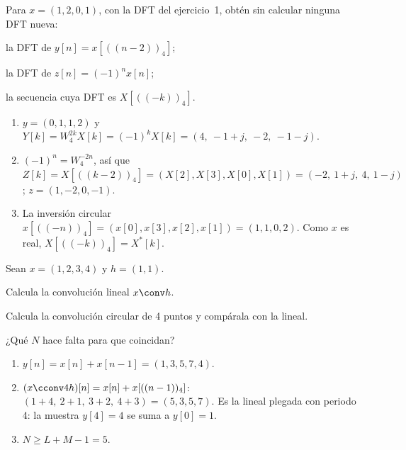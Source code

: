 \documentclass[11pt,a4paper]{scrartcl}
\begin{document}
\begin{ejercicio}
  Para $x=(1,2,0,1)$, con la DFT del ejercicio~1, obtén sin calcular ninguna DFT nueva:
  \begin{incisos}[1]
    \item la DFT de $y[n]=x[((n-2))_4]$;
    \item la DFT de $z[n]=(-1)^nx[n]$;
    \item la secuencia cuya DFT es $X[((-k))_4]$.
  \end{incisos}
\end{ejercicio}
\begin{solucion}
  \begin{enumerate}[label=\alph*)]
    \item $y=(0,1,1,2)$ y $Y[k]=W_4^{2k}X[k]=(-1)^kX[k]=(4,\ -1+j,\ -2,\ -1-j)$.
    \item $(-1)^n=W_4^{-2n}$, así que $Z[k]=X[((k-2))_4]=(X[2],X[3],X[0],X[1])=(-2,\ 1+j,\ 4,\ 1-j)$; $z=(1,-2,0,-1)$.
    \item La inversión circular $x[((-n))_4]=(x[0],x[3],x[2],x[1])=(1,1,0,2)$. Como $x$ es real, $X[((-k))_4]=X^*[k]$.
  \end{enumerate}
\end{solucion}

\begin{ejercicio}
  Sean $x=(1,2,3,4)$ y $h=(1,1)$.
  \begin{incisos}[1]
    \item Calcula la convolución lineal $x\conv h$.
    \item Calcula la convolución circular de 4 puntos y compárala con la lineal.
    \item ¿Qué $N$ hace falta para que coincidan?
  \end{incisos}
\end{ejercicio}
\begin{solucion}
  \begin{enumerate}[label=\alph*)]
    \item $y[n]=x[n]+x[n-1]=(1,3,5,7,4)$.
    \item $(x\cconv4h)[n]=x[n]+x[((n-1))_4]$: $(1+4,\ 2+1,\ 3+2,\ 4+3)=(5,3,5,7)$. Es la lineal plegada con periodo 4: la muestra $y[4]=4$ se suma a $y[0]=1$.
    \item $N\ge L+M-1=5$.
  \end{enumerate}
\end{solucion}
\end{document}
